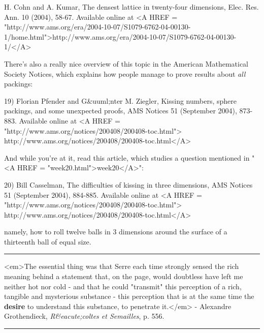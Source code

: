 H. Cohn and A. Kumar, The densest lattice in twenty-four
dimensions, Elec. Res. Ann. 10 (2004), 58-67.   Available online
at <A HREF = "http://www.ams.org/era/2004-10-07/S1079-6762-04-00130-1/home.html">http://www.ams.org/era/2004-10-07/S1079-6762-04-00130-1/</A>

There's also a really nice overview of this topic in the 
American Mathematical Society Notices, which explains how
people manage to prove results about \emph{all} packings:

19) Florian Pfender and G&uuml;nter M. Ziegler, 
Kissing numbers, sphere packings, and some unexpected
proofs, AMS Notices 51 (September 2004), 873-883.
Available online at 
<A HREF = "http://www.ams.org/notices/200408/200408-toc.html">
http://www.ams.org/notices/200408/200408-toc.html</A>

And while you're at it, read this article, which
studies a question mentioned
in "<A HREF = "week20.html">week20</A>":

20) Bill Casselman, The difficulties of kissing in three 
dimensions, AMS Notices 51 (September 2004), 884-885.
Available online at <A HREF = "http://www.ams.org/notices/200408/200408-toc.html">
http://www.ams.org/notices/200408/200408-toc.html</A>

namely, how to roll twelve balls in 3 dimensions around the surface 
of a thirteenth ball of equal size. 


\par\noindent\rule{\textwidth}{0.4pt}
<em>The essential thing was that Serre each time strongly sensed
the rich meaning behind a statement that, on the page, would doubtless
have left me neither hot nor cold - and that he could "transmit"
this perception of a rich, tangible and mysterious substance - this
perception that is at the same time the \textbf{desire} to understand
this substance, to penetrate it.</em> - Alexandre Grothendieck, 
\emph{R&eacute;coltes et Semailles}, p. 556.
 
\par\noindent\rule{\textwidth}{0.4pt}

